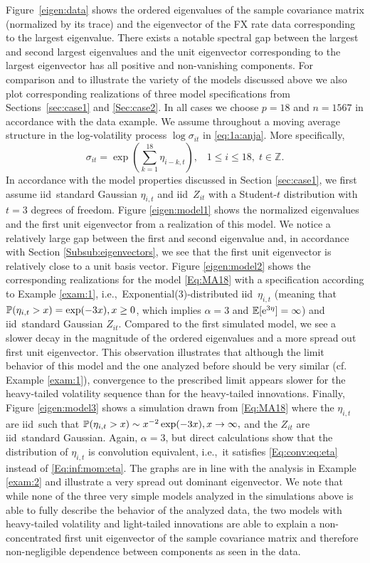 Figure~\ref{eigen:data} shows the ordered eigenvalues of the sample
covariance matrix (normalized by its trace) 
and the eigenvector of the FX rate data corresponding to the largest eigenvalue.
There exists a notable spectral gap 
between the largest and second largest eigenvalues and the unit
eigenvector corresponding to the largest eigenvector 
has all positive and non-vanishing components.
For comparison and to illustrate the variety of the models discussed
above we also plot corresponding realizations of three model
specifications from Sections~\ref{sec:case1} and \ref{Sec:case2}. 
In all cases we choose $p=18$ and $n=1567$ in accordance with the data example. 
We assume throughout a moving average structure in the log-volatility
process $\log \sigma_{it}$ in \eqref{eq:1a:anja}. More specifically,
\begin{equation}\label{Eq:MA18} \sigma_{it}=\exp(\sum_{k=1}^{18}\eta_{i-k,t}), \;\;\; 1 \leq i \leq 18, \; t \in \mathbb{Z}. \end{equation}
In accordance with the model properties discussed in Section \ref{sec:case1}, we first assume iid\ standard Gaussian $\eta_{i,t}$ and iid\ $Z_{it}$ with a Student-$t$ distribution with $t=3$ degrees of freedom. 
Figure \ref{eigen:model1} shows the normalized eigenvalues and the first unit eigenvector from a realization of this model. We notice a relatively large gap between the first and second eigenvalue and, in accordance with Section \ref{Subsub:eigenvectors}, we see that the first unit eigenvector is relatively close to a unit basis vector. 
Figure \ref{eigen:model2} shows the corresponding realizations for the model \eqref{Eq:MA18} with a specification according to Example \ref{exam:1}, i.e.,\ Exponential(3)-distributed iid\ $\eta_{i,t}$ (meaning that $\P(\eta_{i,t}>x)=\exp(-3x), x \geq 0$, 
which implies $\alpha=3$ and $\E[\ex^{3 \eta}]=\infty$) and iid\ standard Gaussian $Z_{it}$. Compared to the first simulated model, we see a slower decay in the magnitude of the ordered eigenvalues and a more spread out first unit eigenvector. This 
observation illustrates that although the limit behavior of this model and the one analyzed 
before should be very similar (cf. Example \ref{exam:1}), convergence to the prescribed limit appears slower for the heavy-tailed volatility sequence than for the heavy-tailed innovations. 
Finally, Figure \ref{eigen:model3} shows a simulation drawn from \eqref{Eq:MA18} where the $\eta_{i,t}$ are iid\ such that $\P(\eta_{i,t}>x) \sim x^{-2}\exp(-3x), x \to \infty,$ and the $Z_{it}$ are iid\ standard Gaussian. Again, $\alpha=3$, but direct calculations show that the distribution of $\eta_{i,t}$ is convolution equivalent, i.e.,\ it satisfies \eqref{Eq:conv:eq:eta} instead of \eqref{Eq:inf:mom:eta}. The graphs are in line with the analysis in Example \ref{exam:2} and illustrate a very spread out dominant eigenvector. We note that while none of the three very simple models analyzed in the simulations above is able to fully describe
the behavior of the analyzed data, the two models with heavy-tailed volatility and light-tailed innovations are able 
to explain a non-concentrated first unit eigenvector of the sample covariance matrix and 
therefore non-negligible dependence between components as seen in the data.

